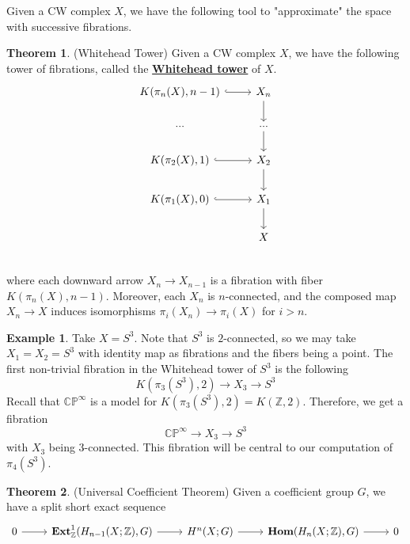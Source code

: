 \documentclass{article}
\theoremstyle{definition}
\newtheorem{theorem}{Theorem}[section]
\theoremstyle{definition}
\theoremstyle{definition}
\theoremstyle{definition}
\theoremstyle{definition}
\theoremstyle{definition}
\newtheorem{example}{Example}[theorem]
\begin{document}
Given a CW complex $X$, we have the following tool to "approximate" the space with successive fibrations. 
\begin{tcolorbox}[colback=red!5!white,colframe=red!30!white]
\begin{theorem}
(Whitehead Tower) Given a CW complex $X$, we have the following tower of fibrations, called the \underline{\textbf{Whitehead tower}} of $X$.
\[ \begin{tikzcd}
K(\pi_n(X),n-1)\arrow[r,hookrightarrow]& X_n\arrow[d]\\
...& ...\arrow[d]\\
K(\pi_2(X),1)\arrow[r,hookrightarrow]& X_2\arrow[d]\\
K(\pi_1(X),0)\arrow[r,hookrightarrow]& X_1\arrow[d]\\
& X\\
\end{tikzcd} \]
where each downward arrow $X_n\to X_{n-1}$ is a fibration with fiber $K(\pi_n(X),n-1)$. Moreover, each $X_n$ is $n$-connected, and the composed map $X_n\to X$ induces isomorphisms $\pi_i(X_n)\to \pi_i(X)$ for $i>n$.
\end{theorem}
\end{tcolorbox}
 
 \begin{tcolorbox}[colback=yellow!5!white,colframe=yellow!30!white]
 \begin{example}
 Take $X=S^3$. Note that $S^3$ is $2$-connected, so we may take $X_1=X_2=S^3$ with identity map as fibrations and the fibers being a point. The first non-trivial fibration in the Whitehead tower of $S^3$ is the following 
 \[K(\pi_3(S^3),2)\to X_3\to S^3\]
 Recall that $\mathbb{CP}^{\infty}$ is a model for $K(\pi_3(S^3),2)=K(\mathbb{Z},2)$. Therefore, we get a fibration 
 \[\mathbb{CP} ^{\infty}\to X_3\to S^3\] 
 with $X_3$ being $3$-connected. This fibration will be central to our computation of $\pi_4(S^3)$. 
 \end{example}
 \end{tcolorbox}




\begin{tcolorbox}[colback=red!5!white,colframe=red!30!white]
\begin{theorem}
    (Universal Coefficient Theorem) Given a coefficient group $G$, we have a split short exact sequence
    \[\begin{tikzcd}
    0\arrow[r]& \textbf{Ext}^1_{\mathbb{Z}}(H_{n-1}(X;\mathbb{Z}),G) \arrow[r]&H^n(X;G)\arrow[r]&\textbf{Hom}(H_n(X;\mathbb{Z}),G)\arrow[r]&0
    \end{tikzcd}\]
\end{theorem}
\end{tcolorbox}
\end{document}
